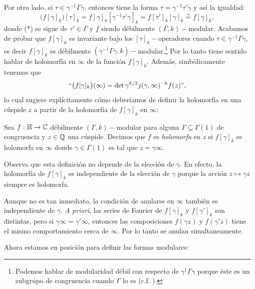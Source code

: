 \documentclass[../../tesis_maestria]{subfiles}
\begin{document}
Por otro lado, si $\tau\in\gamma^{-1}\Gamma\gamma$, entonces tiene la forma
$\tau=\gamma^{-1}\tau'\gamma$ y as\'i la igualdad:
\[
  \big(f[\gamma]_k\big)[\tau]_k=f[\gamma]_k[\gamma^{-1}\tau'\gamma]_k=f[\tau']_k[\gamma]_k
  \overset{*}{=}f[\gamma]_k,
\]
donde (*) se sigue de $\tau'\in\Gamma$ y $f$ siendo d\'ebilmente $(\Gamma,k)-$modular. Acabamos
de probar que $f[\gamma]_k$ es invariante bajo los $[\tau]_k-$operadores cuando
$\tau\in\gamma^{-1}\Gamma\gamma$, es decir $f[\gamma]_k$ es d\'ebilmente
$(\gamma^{-1}\Gamma\gamma,k)-$modular.\footnote{Podemos hablar de modularidad d\'ebil con respecto
  de $\gamma^{1}\Gamma\gamma$ porque \'este es un subgrupo de congruencia cuando $\Gamma$ lo es
  (c.f. \cite[\S1.4, lema 1.4.1]{BumpAFAR}).}
Por lo tanto tiene sentido hablar de holomorf\'ia en $\infty$ de la funci\'on $f[\gamma]_k$. Adem\'as,
simb\'olicamente tenemos que
\[
  ``\big(f[\gamma]_k\big)(\infty)=\det\gamma^{k/2}j(\gamma,\infty)^{-k}f(z)\text{''},
\]
lo cual sugiere expl\'icitamente c\'omo deber\'iamos de definir la holomorf\'ia en una c\'uspide
$z$ a partir de la holomorf\'ia de $f[\gamma]_k$ en $\infty$:

\begin{defin}
  Sea $f:\mathbb{H}\rightarrow\mathbb{C}$ d\'ebilmente $(\Gamma,k)-$modular para alguna $\Gamma\subseteq\Gamma(1)$ de
  congruencia y $z\in\mathbb{Q}$ una c\'uspide. Decimos que $f$ es \emph{holomorfa} en $z$ si $f[\gamma]_k$
  es holomorfa en $\infty$ donde $\gamma\in\Gamma(1)$ es tal que $z=\gamma\infty$.
\end{defin}

Observa que esta definici\'on no depende de la elecci\'on de $\gamma$. En efecto, la holomorf\'ia
de $f[\gamma]_k$ es independiente de la elecci\'on de $\gamma$ porque la acci\'on $z\mapsto\gamma z$
siempre es holomorfa.

Aunque no es tan inmediato, la condici\'on de anularse en $\infty$ tambi\'en es independiente de
$\gamma$. \emph{A priori}, las series de Fourier de $f[\gamma]_k$ y $f[\gamma']_k$ son distintas,
pero si $\gamma\infty=\gamma'\infty$, entonces las composiciones $f(\gamma z)$ y $f(\gamma'z)$ tiene
el mismo comportamiento cerca de $\infty$. Por lo tanto se anulan simultaneamente.

Ahora estamos en posici\'on para definir las formas modulares:
\end{document}
